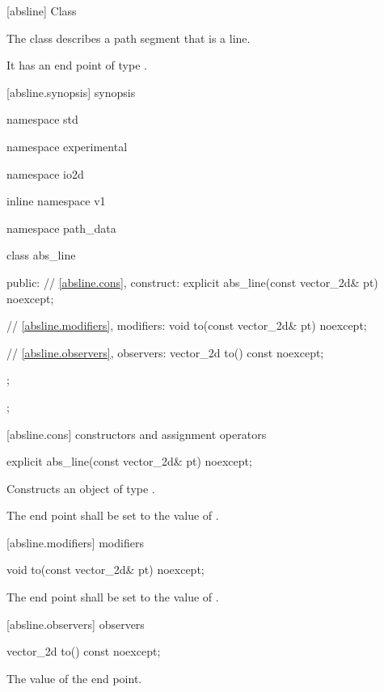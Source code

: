  [absline] {Class }

\pnum
{}
The class  describes a path segment that is a line.

\pnum
It has an end point of type .

 [absline.synopsis] { synopsis}

\begin{codeblock}
namespace std { namespace experimental { namespace io2d { inline namespace v1 {
  namespace path_data {
    class abs_line {
    public:
      // \ref{absline.cons}, construct:
      explicit abs_line(const vector_2d& pt) noexcept;

      // \ref{absline.modifiers}, modifiers:
      void to(const vector_2d& pt) noexcept;

      // \ref{absline.observers}, observers:
      vector_2d to() const noexcept;
    };
  };
} } } }
\end{codeblock}

 [absline.cons] { constructors and assignment operators}

\begin{itemdecl}
    explicit abs_line(const vector_2d& pt) noexcept;
\end{itemdecl}
\begin{itemdescr}
	\pnum
	\effects
	Constructs an object of type .
	
	\pnum
	The end point shall be set to the value of .
\end{itemdescr}

 [absline.modifiers]{ modifiers}

\begin{itemdecl}
    void to(const vector_2d& pt) noexcept;
\end{itemdecl}
\begin{itemdescr}
	\pnum
	\effects
	The end point shall be set to the value of .
\end{itemdescr}

 [absline.observers]{ observers}

\begin{itemdecl}
    vector_2d to() const noexcept;
\end{itemdecl}
\begin{itemdescr}
	\pnum
	\returns
	The value of the end point.
\end{itemdescr}
